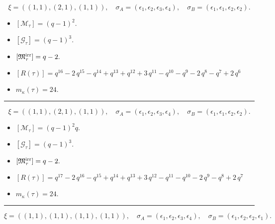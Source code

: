 \documentclass[10pt,a4paper]{amsart}
\begin{document}
$$\xi = ({(1, 1)}, {(2, 1), (1, 1)}),\quad \sigma_A = ({{\epsilon_1}}, {{\epsilon_2, \epsilon_3}, {\epsilon_4}}),\quad \sigma_B = ({{\epsilon_1}}, {{\epsilon_1, \epsilon_2}, {\epsilon_2}}).$$

\begin{itemize}
 \item $[\mathcal{M}_{\tau}] = {\left(q - 1\right)}^{2} .$

 \item $[\mathcal{G}_{\tau}] = {\left(q - 1\right)}^{3} .$

 \item $[{\frak M}_{\tau}^{\textrm{irr}}] = q - 2 .$

 \item $[R(\tau)] = q^{16} - 2 \, q^{15} - q^{14} + q^{13} + q^{12} + 3 \, q^{11} - q^{10} - q^{9} - 2 \, q^{8} - q^{7} + 2 \, q^{6} $

 \item $m_{\kappa}(\tau) = 24 .$

 \end{itemize}
\noindent\rule{8cm}{0.4pt}

$$\xi = ({(1, 1)}, {(2, 1)}, {(1, 1)}),\quad \sigma_A = ({{\epsilon_1}}, {{\epsilon_2, \epsilon_3}}, {{\epsilon_4}}),\quad \sigma_B = ({{\epsilon_1}}, {{\epsilon_1, \epsilon_2}}, {{\epsilon_2}}).$$

\begin{itemize}
 \item $[\mathcal{M}_{\tau}] = {\left(q - 1\right)}^{2} q .$

 \item $[\mathcal{G}_{\tau}] = {\left(q - 1\right)}^{3} .$

 \item $[{\frak M}_{\tau}^{\textrm{irr}}] = q - 2 .$

 \item $[R(\tau)] = q^{17} - 2 \, q^{16} - q^{15} + q^{14} + q^{13} + 3 \, q^{12} - q^{11} - q^{10} - 2 \, q^{9} - q^{8} + 2 \, q^{7} $

 \item $m_{\kappa}(\tau) = 24 .$

 \end{itemize}
\noindent\rule{8cm}{0.4pt}

$$\xi = ({(1, 1)}, {(1, 1), (1, 1)}, {(1, 1)}),\quad \sigma_A = ({{\epsilon_1}}, {{\epsilon_2}, {\epsilon_3}}, {{\epsilon_4}}),\quad \sigma_B = ({{\epsilon_1}}, {{\epsilon_2}, {\epsilon_2}}, {{\epsilon_1}}).$$
\end{document}
